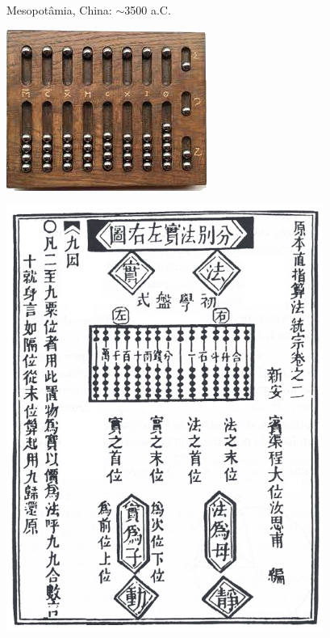\begin{multicols}{3}
	\large Mesopotâmia, China: $\sim$3500 a.C.
	
	\begin{center}
	\includegraphics[width=\linewidth]{./IMG/abaco.jpeg}
\end{center}

\vfill
\columnbreak

\begin{center}
	\includegraphics[width=\linewidth]{./IMG/abaco.png}
\end{center}


\end{multicols}
